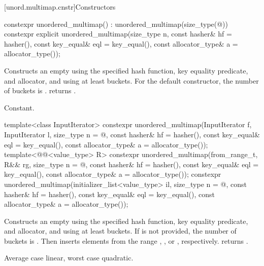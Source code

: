 [unord.multimap.cnstr]{Constructors}

%
\begin{itemdecl}
constexpr unordered_multimap() : unordered_multimap(size_type(@\seebelow@)) { }
constexpr explicit unordered_multimap(size_type n, const hasher& hf = hasher(),
                                      const key_equal& eql = key_equal(),
                                      const allocator_type& a = allocator_type());
\end{itemdecl}

\begin{itemdescr}
\pnum
\effects
Constructs an empty  using the
specified hash function, key equality predicate, and allocator, and
using at least  buckets.  For the default constructor,
the number of buckets is .
 returns .

\pnum
\complexity
Constant.
\end{itemdescr}

%
\begin{itemdecl}
template<class InputIterator>
  constexpr unordered_multimap(InputIterator f, InputIterator l,
                               size_type n = @\seebelow@, const hasher& hf = hasher(),
                               const key_equal& eql = key_equal(),
                               const allocator_type& a = allocator_type());
template<@@<value_type> R>
  constexpr unordered_multimap(from_range_t, R&& rg,
                               size_type n = @\seebelow@, const hasher& hf = hasher(),
                               const key_equal& eql = key_equal(),
                               const allocator_type& a = allocator_type());
constexpr unordered_multimap(initializer_list<value_type> il,
                             size_type n = @\seebelow@, const hasher& hf = hasher(),
                             const key_equal& eql = key_equal(),
                             const allocator_type& a = allocator_type());
\end{itemdecl}

\begin{itemdescr}
\pnum
\effects
Constructs an empty  using the
specified hash function, key equality predicate, and allocator, and
using at least  buckets. If  is not
provided, the number of buckets is . Then
inserts elements from the range , , or ,
respectively.
 returns .

\pnum
\complexity
Average case linear, worst case quadratic.
\end{itemdescr}

